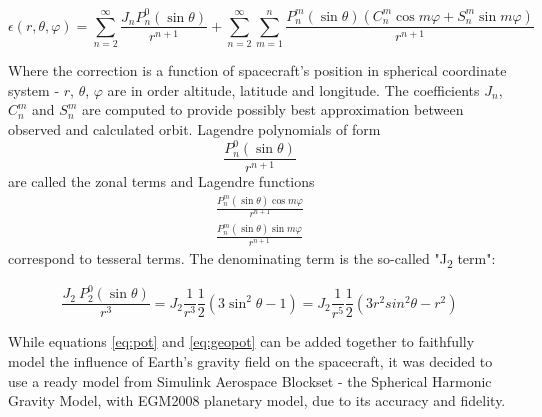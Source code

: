         \begin{equation}
            \epsilon(r, \theta, \varphi) = \sum_{n=2}^{\infty}  \frac{J_n P^0_n(\sin\theta) }{r^{n+1}} + \sum_{n=2}^{\infty} \sum_{m=1}^n \frac{ P^m_n(\sin\theta) (C_n^m \cos m\varphi + S_n^m \sin m\varphi)}{r^{n+1}}\label{eq:geopot}
        \end{equation}

        Where the correction is a function of spacecraft's position in spherical coordinate system - $r$, $\theta$, $\varphi$ are in order altitude, latitude and longitude. The coefficients $J_n$, $C_n^m$ and $S_n^m$ are computed to provide possibly best approximation between observed and calculated orbit. Lagendre polynomials of form 
        \begin{equation}
            \frac{P^0_n(\sin\theta) }{r^{n+1}}    
        \end{equation}
        are called the zonal terms and Lagendre functions 
        \begin{equation}
        \begin{aligned}
            \frac{ P^m_n(\sin\theta) \cos m\varphi}{r^{n+1}}\\
            \frac{ P^m_n(\sin\theta) \sin m\varphi}{r^{n+1}}
        \end{aligned}
        \end{equation}
        correspond to tesseral terms. The denominating term is the so-called "J\textsubscript{2} term":

        \begin{equation}
            \frac{J_2\ P^0_2(\sin\theta)}{r^3} = J_2 \frac{1}{r^3} \frac{1}{2} (3\sin^2\theta -1) = J_2 \frac{1}{r^5} \frac{1}{2} (3 r^2sin^2\theta -r^2)
        \end{equation}

        While equations \eqref{eq:pot} and \eqref{eq:geopot} can be added together to faithfully model the influence of Earth's gravity field on the spacecraft, it was decided to use a ready model from Simulink Aerospace Blockset - the Spherical Harmonic Gravity Model, with EGM2008 planetary model, due to its accuracy and fidelity.


